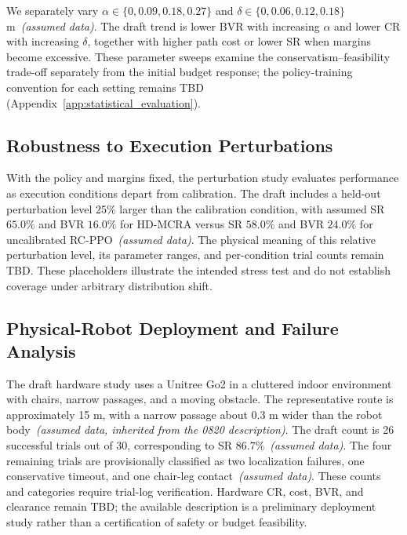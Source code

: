 \documentclass{article}
\begin{document}
We separately vary $\alpha\in\{0,0.09,0.18,0.27\}$ and
$\delta\in\{0,0.06,0.12,0.18\}$ m~\textit{(assumed data)}. The draft trend is
lower BVR with increasing $\alpha$ and lower CR with increasing $\delta$, together
with higher path cost or lower SR when margins become excessive. These parameter
sweeps examine the conservatism--feasibility trade-off separately from the initial
budget response; the policy-training convention for each setting remains
\textsc{TBD} (Appendix~\ref{app:statistical_evaluation}).

\subsection{Robustness to Execution Perturbations}
\label{sec:execution_robustness}
With the policy and margins fixed, the perturbation study evaluates performance as
execution conditions depart from calibration. The draft includes a held-out
perturbation level 25\% larger than the calibration condition, with assumed SR
$65.0\%$ and BVR $16.0\%$ for HD-MCRA versus SR $58.0\%$ and BVR $24.0\%$ for
uncalibrated RC-PPO~\textit{(assumed data)}. The physical meaning of this relative
perturbation level, its parameter ranges, and per-condition trial counts remain
\textsc{TBD}. These placeholders illustrate the intended stress test and do not
establish coverage under arbitrary distribution shift.

\subsection{Physical-Robot Deployment and Failure Analysis}
\label{sec:hardware_deployment}
The draft hardware study uses a Unitree Go2 in a cluttered indoor environment with
chairs, narrow passages, and a moving obstacle. The representative route is
approximately 15 m, with a narrow passage about 0.3 m wider than the robot
body~\textit{(assumed data, inherited from the 0820 description)}. The draft count
is 26 successful trials out of 30, corresponding to SR $86.7\%$~\textit{(assumed
data)}. The four remaining trials are provisionally classified as two localization
failures, one conservative timeout, and one chair-leg contact~\textit{(assumed data)}.
These counts and categories require trial-log verification. Hardware CR, cost,
BVR, and clearance remain \textsc{TBD}; the available description is a preliminary
deployment study rather than a certification of safety or budget feasibility.
\end{document}
